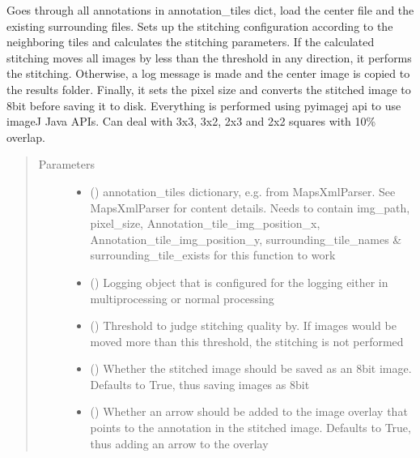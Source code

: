 \documentclass[letterpaper,10pt,english]{sphinxmanual}
\begin{document}
\begin{fulllineitems}
\begin{fulllineitems}
Goes through all annotations in annotation\_tiles dict, load the center file and the existing surrounding files.
Sets up the stitching configuration according to the neighboring tiles and calculates the stitching parameters.
If the calculated stitching moves all images by less than the threshold in any direction, it performs the
stitching. Otherwise, a log message is made and the center image is copied to the results folder.
Finally, it sets the pixel size and converts the stitched image to 8bit before saving it to disk. Everything is
performed using pyimagej api to use imageJ Java APIs.
Can deal with 3x3, 3x2, 2x3 and 2x2 squares with 10\% overlap.
\begin{quote}\begin{description}
\item[{Parameters}] \leavevmode\begin{itemize}
\item {} 
 () \textendash{} annotation\_tiles dictionary, e.g. from MapsXmlParser. See MapsXmlParser for content
details. Needs to contain img\_path, pixel\_size, Annotation\_tile\_img\_position\_x,
Annotation\_tile\_img\_position\_y, surrounding\_tile\_names \& surrounding\_tile\_exists for this function
to work

\item {} 
 () \textendash{} Logging object that is configured for the logging either in multiprocessing or normal
processing

\item {} 
 () \textendash{} Threshold to judge stitching quality by. If images would be moved more than this
threshold, the stitching is not performed

\item {} 
 () \textendash{} Whether the stitched image should be saved as an 8bit image. Defaults to True, thus saving
images as 8bit

\item {} 
 () \textendash{} Whether an arrow should be added to the image overlay that points to the annotation in
the stitched image. Defaults to True, thus adding an arrow to the overlay


\end{itemize}
\end{description}
\end{quote}
\end{fulllineitems}
\end{fulllineitems}
\end{document}
